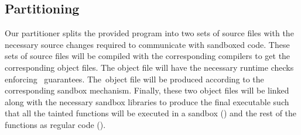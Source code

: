 \subsection{Partitioning}
Our partitioner splits the provided program into two sets of source files with the necessary source changes required to communicate with sandboxed code.
These sets of source files will be compiled with the corresponding compilers to get the corresponding object files.
The \cregion object file will have the necessary runtime checks enforcing~\systemname{} guarantees.
The~\ucregion object file will be produced according to the corresponding sandbox mechanism.
Finally, these two object files will be linked along with the necessary sandbox libraries to produce the final executable such that all the tainted functions will be executed in a sandbox (\ucregion) and the rest of the functions as regular code (\cregion).



